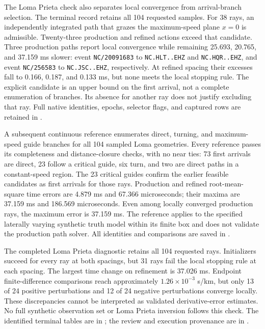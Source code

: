 The Loma Prieta check also separates local convergence from arrival-branch
selection. The terminal record retains all 104 requested samples.
For 38 rays, an independently
integrated path that grazes the maximum-speed plane $x=0$ is admissible.
Twenty-three production and refined actions exceed that candidate. Three
production paths report local convergence while remaining 25.693, 20.765,
and 37.159 ms slower:
event \texttt{NC/20091683} to \texttt{NC.HLT..EHZ} and
\texttt{NC.HQR..EHZ}, and event \texttt{NC/256583} to
\texttt{NC.JSC..EHZ}, respectively. At refined spacing their excesses fall
to 0.166, 0.187, and 0.133 ms, but none meets the local stopping rule.
The explicit candidate is an upper bound on the first
arrival, not a complete enumeration of branches. Its absence for another
ray does not justify excluding that ray. Full native identities, epochs,
selector flags, and captured rows are retained in
.

A subsequent continuous reference enumerates direct, turning, and
maximum-speed guide branches for all 104 sampled Loma geometries. Every
reference passes its completeness and distance-closure checks, with no
near ties: 73 first arrivals are direct, 23 follow a critical guide,
six turn, and two are direct paths in a constant-speed region. The
23 critical guides confirm the earlier feasible candidates as first
arrivals for those rays. Production and refined root-mean-square time
errors are 4.879 ms and 67.366 microseconds; their maxima are 37.159 ms
and 186.569 microseconds. Even among locally converged production rays,
the maximum error is 37.159 ms. The reference applies to the specified
laterally varying synthetic truth model within its finite box and does
not validate the production path solver. All identities and comparisons
are saved in
.

The completed Loma Prieta diagnostic retains all 104 requested rays.
Initializers succeed for every ray at both spacings, but 31 rays fail the
local stopping rule at each spacing. The largest time change on refinement
is 37.026 ms. Endpoint finite-difference comparisons reach approximately
$1.26\times10^{-3}$ s/km, but only 13 of 24 positive perturbations and
12 of 24 negative perturbations converge locally. These discrepancies
cannot be interpreted as validated derivative-error estimates. No
full synthetic observation set or Loma Prieta inversion follows this check.
The identified terminal tables are in ; the review
and execution provenance are in
.


